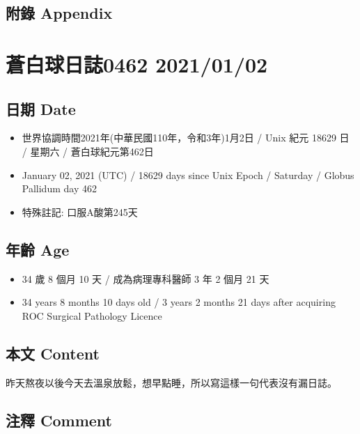 \documentclass[a5paper, 11pt
]{book}
\providecommand{\tightlist}{%
  \setlength{\itemsep}{0pt}\setlength{\parskip}{0pt}}
\begin{document}
\hypertarget{ux9644ux9304-appendix-31}{%
\subsection{附錄 Appendix}\label{ux9644ux9304-appendix-31}}

\hypertarget{ux84bcux767dux7403ux65e5ux8a8c0462-20210102}{%
\section{蒼白球日誌0462
2021/01/02}\label{ux84bcux767dux7403ux65e5ux8a8c0462-20210102}}

\hypertarget{ux65e5ux671f-date-32}{%
\subsection{日期 Date}\label{ux65e5ux671f-date-32}}

\begin{itemize}
\tightlist
\item
  世界協調時間2021年(中華民國110年，令和3年)1月2日 / Unix 紀元 18629 日
  / 星期六 / 蒼白球紀元第462日
\item
  January 02, 2021 (UTC) / 18629 days since Unix Epoch / Saturday /
  Globus Pallidum day 462
\item
  特殊註記: 口服A酸第245天
\end{itemize}

\hypertarget{ux5e74ux9f61-age-32}{%
\subsection{年齡 Age}\label{ux5e74ux9f61-age-32}}

\begin{itemize}
\tightlist
\item
  34 歲 8 個月 10 天 / 成為病理專科醫師 3 年 2 個月 21 天
\item
  34 years 8 months 10 days old / 3 years 2 months 21 days after
  acquiring ROC Surgical Pathology Licence
\end{itemize}

\hypertarget{ux672cux6587-content-32}{%
\subsection{本文 Content}\label{ux672cux6587-content-32}}

昨天熬夜以後今天去溫泉放鬆，想早點睡，所以寫這樣一句代表沒有漏日誌。

\hypertarget{ux6ce8ux91cb-comment-32}{%
\subsection{注釋 Comment}\label{ux6ce8ux91cb-comment-32}}
\end{document}
